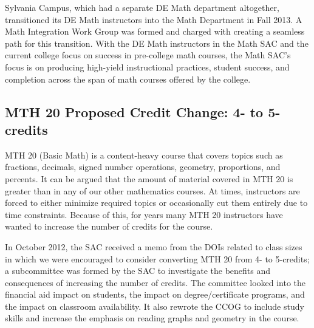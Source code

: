 Sylvania Campus, which had a separate DE Math department altogether,
transitioned its DE Math instructors into the Math Department in Fall 2013.  A
Math Integration Work Group was formed and charged with creating a seamless path
for this transition.  With the DE Math instructors in the Math SAC and the
current college focus on success in pre-college math courses, the Math SAC's focus is
on producing high-yield instructional practices, student success, and completion
across the span of math courses offered by the college.
 
\subsection{MTH 20 Proposed Credit Change: 4- to 5-credits}\label{cur:sub:mth20}
MTH 20 (Basic Math) is a content-heavy course that covers topics such as
fractions, decimals, signed number operations, geometry, proportions, and
percents.  It can be argued that the amount of material covered in MTH 20 is
greater than in any of our other mathematics courses.  At times, instructors are
forced to either minimize required topics or occasionally cut them entirely due
to time constraints.  Because of this, for years many MTH 20 instructors have
wanted to increase the number of credits for the course.  

In October 2012, the SAC received a memo from the DOIs related to class sizes in
which we were encouraged to consider converting MTH 20 from 4- to 5-credits;  a subcommittee was formed by the SAC to investigate the benefits and
consequences of increasing the number of credits.  The committee
looked into the financial aid impact on students, the impact on
degree/certificate programs, and the impact on classroom availability.  It also
rewrote the CCOG to include study skills and increase the emphasis on reading
graphs and geometry in the course.  


